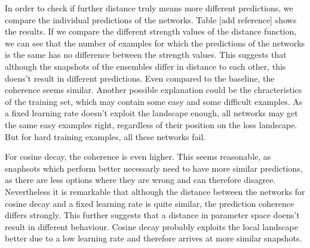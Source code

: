 In order to check if further distance truly means more different predictions, we
compare the individual predictions of the networks. Table [add reference] shows
the results. If we compare the different strength values of the distance
function, we can see that the number of examples for which the predictions of
the networks is the same has no difference between the strength values. This
suggests that although the snapshots of the ensembles differ in distance to each
other, this doens't result in different predictions. Even compared to the
baseline, the coherence seems similar. Another possible explanation could be the
chracteristics of the training set, which may contain some easy and some
difficult examples. As a fixed learning rate doesn't exploit the landscape
enough, all networks may get the same easy examples right, regardless of their
position on the loss landscape. But for hard training examples, all these
networks fail.



For cosine decay, the coherence is even higher. This seems reasonable, as
snaphsots which perform better necessarly need to have more similar predictions,
as there are less options where they are wrong and can therefore disagree.
Nevertheless it is remarkable that although the distance between the networks
for cosine decay and a fixed learning rate is quite similar, the prediction
coherence differs strongly. This further suggests that a distance in parameter
space doens't result in different behaviour. Cosine decay probably exploits the
local landscape better due to a low learning rate and therefore arrives at more
similar snapshots.




